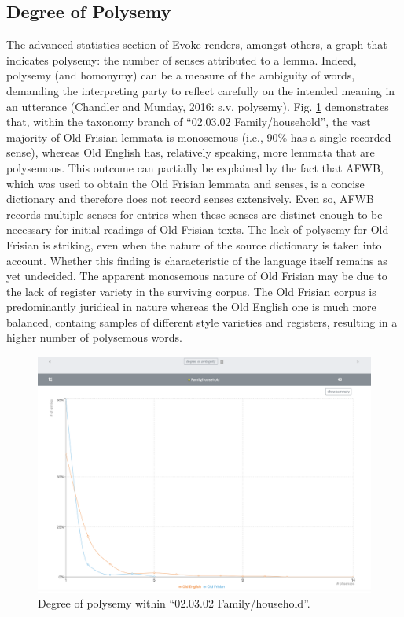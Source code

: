 \subsection{Degree of Polysemy}
The advanced statistics section of Evoke renders, amongst others, a graph that indicates polysemy: the number of senses attributed to a lemma. Indeed, polysemy (and homonymy) can be a measure of the ambiguity of words, demanding the interpreting party to reflect carefully on the intended meaning in an utterance (Chandler and Munday, 2016: s.v. polysemy). Fig. \ref{fig:Stolk2021b:Fig6} demonstrates that, within the taxonomy branch of “02.03.02 Family/household”, the vast majority of Old Frisian lemmata is monosemous (i.e., 90\% has a single recorded sense), whereas Old English has, relatively speaking, more lemmata that are polysemous. This outcome can partially be explained by the fact that AFWB, which was used to obtain the Old Frisian lemmata and senses, is a concise dictionary and therefore does not record senses extensively. Even so, AFWB records multiple senses for entries when these senses are distinct enough to be necessary for initial readings of Old Frisian texts. The lack of polysemy for Old Frisian is striking, even when the nature of the source dictionary is taken into account. Whether this finding is characteristic of the language itself remains as yet undecided. The apparent monosemous nature of Old Frisian may be due to the lack of register variety in the surviving corpus. The Old Frisian corpus is predominantly juridical in nature whereas the Old English one is much more balanced, containg samples of different style varieties and registers, resulting in a higher number of polysemous words. 


\begin{figure}[htbp]
	\includegraphics[width=\textwidth]{Stolk2021b/fig/Fig6.png}
	\caption[]{\label{fig:Stolk2021b:Fig6} Degree of polysemy within “02.03.02 Family/household”.}
\end{figure}


